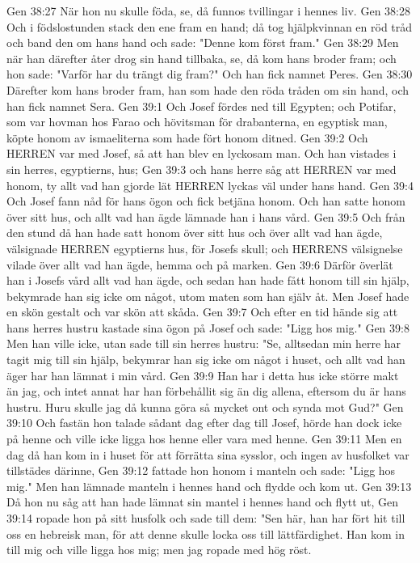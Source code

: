 Gen 38:27  När hon nu skulle föda, se, då funnos tvillingar i hennes liv.
Gen 38:28  Och i födslostunden stack den ene fram en hand; då tog hjälpkvinnan en röd tråd och band den om hans hand och sade: "Denne kom först fram."
Gen 38:29  Men när han därefter åter drog sin hand tillbaka, se, då kom hans broder fram; och hon sade: "Varför har du trängt dig fram?" Och han fick namnet Peres.
Gen 38:30  Därefter kom hans broder fram, han som hade den röda tråden om sin hand, och han fick namnet Sera.
Gen 39:1  Och Josef fördes ned till Egypten; och Potifar, som var hovman hos Farao och hövitsman för drabanterna, en egyptisk man, köpte honom av ismaeliterna som hade fört honom ditned.
Gen 39:2  Och HERREN var med Josef, så att han blev en lyckosam man. Och han vistades i sin herres, egyptierns, hus;
Gen 39:3  och hans herre såg att HERREN var med honom, ty allt vad han gjorde lät HERREN lyckas väl under hans hand.
Gen 39:4  Och Josef fann nåd för hans ögon och fick betjäna honom. Och han satte honom över sitt hus, och allt vad han ägde lämnade han i hans vård.
Gen 39:5  Och från den stund då han hade satt honom över sitt hus och över allt vad han ägde, välsignade HERREN egyptierns hus, för Josefs skull; och HERRENS välsignelse vilade över allt vad han ägde, hemma och på marken.
Gen 39:6  Därför överlät han i Josefs vård allt vad han ägde, och sedan han hade fått honom till sin hjälp, bekymrade han sig icke om något, utom maten som han själv åt. Men Josef hade en skön gestalt och var skön att skåda.
Gen 39:7  Och efter en tid hände sig att hans herres hustru kastade sina ögon på Josef och sade: "Ligg hos mig."
Gen 39:8  Men han ville icke, utan sade till sin herres hustru: "Se, alltsedan min herre har tagit mig till sin hjälp, bekymrar han sig icke om något i huset, och allt vad han äger har han lämnat i min vård.
Gen 39:9  Han har i detta hus icke större makt än jag, och intet annat har han förbehållit sig än dig allena, eftersom du är hans hustru. Huru skulle jag då kunna göra så mycket ont och synda mot Gud?"
Gen 39:10  Och fastän hon talade sådant dag efter dag till Josef, hörde han dock icke på henne och ville icke ligga hos henne eller vara med henne.
Gen 39:11  Men en dag då han kom in i huset för att förrätta sina sysslor, och ingen av husfolket var tillstädes därinne,
Gen 39:12  fattade hon honom i manteln och sade: "Ligg hos mig." Men han lämnade manteln i hennes hand och flydde och kom ut.
Gen 39:13  Då hon nu såg att han hade lämnat sin mantel i hennes hand och flytt ut,
Gen 39:14  ropade hon på sitt husfolk och sade till dem: "Sen här, han har fört hit till oss en hebreisk man, för att denne skulle locka oss till lättfärdighet. Han kom in till mig och ville ligga hos mig; men jag ropade med hög röst.
